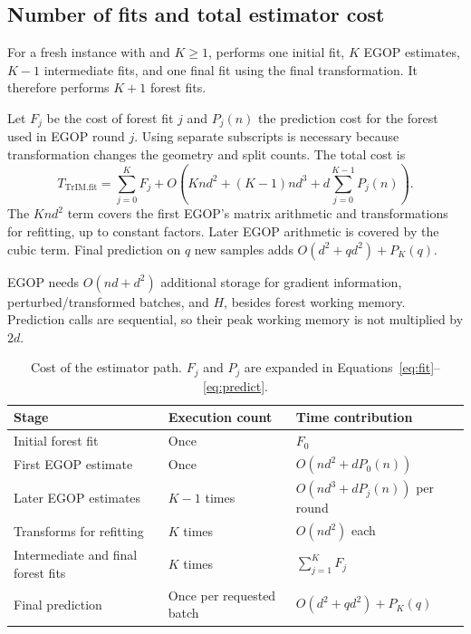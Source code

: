 \documentclass[11pt]{article}
\newcommand{\code}[1]{\texttt{\detokenize{#1}}}
\begin{document}
\subsection{Number of fits and total estimator cost}

For a fresh instance with \code{iteration = K} and $K\geq1$, \code{TrIM.fit} performs one initial fit, $K$ EGOP estimates, $K-1$ intermediate fits, and one final fit using the final transformation. It therefore performs $K+1$ forest fits.

Let $F_j$ be the cost of forest fit $j$ and $P_j(n)$ the prediction cost for the forest used in EGOP round $j$. Using separate subscripts is necessary because transformation changes the geometry and split counts. The total cost is
\begin{equation}
\boxed{
T_{\mathrm{TrIM.fit}}
=\sum_{j=0}^{K} F_j
+O\left(Knd^2+(K-1)nd^3
+d\sum_{j=0}^{K-1}P_j(n)\right).
}
\end{equation}
The $Knd^2$ term covers the first EGOP's matrix arithmetic and transformations for refitting, up to constant factors. Later EGOP arithmetic is covered by the cubic term. Final prediction on $q$ new samples adds $O(d^2+qd^2)+P_K(q)$.

EGOP needs $O(nd+d^2)$ additional storage for gradient information, perturbed/transformed batches, and $H$, besides forest working memory. Prediction calls are sequential, so their peak working memory is not multiplied by $2d$.

\begin{table}[htbp]
\centering\small
\begin{tabularx}{\textwidth}{YY Y}
\toprule
Stage & Execution count & Time contribution \\
\midrule
Initial forest fit & Once & $F_0$ \\
First EGOP estimate & Once & $O(nd^2+dP_0(n))$ \\
Later EGOP estimates & $K-1$ times & $O(nd^3+dP_j(n))$ per round \\
Transforms for refitting & $K$ times & $O(nd^2)$ each \\
Intermediate and final forest fits & $K$ times & $\sum_{j=1}^{K}F_j$ \\
Final prediction & Once per requested batch & $O(d^2+qd^2)+P_K(q)$ \\
\bottomrule
\end{tabularx}
\caption{Cost of the estimator path. $F_j$ and $P_j$ are expanded in Equations~\eqref{eq:fit}--\eqref{eq:predict}.}
\end{table}
\end{document}

